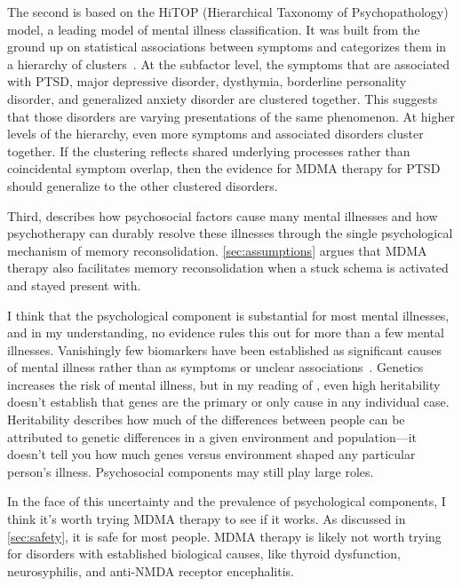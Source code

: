\documentclass[11pt,oneside]{book}
\let\cite\parencite
\begin{document}
The second is based on the HiTOP (Hierarchical Taxonomy of Psychopathology) model, a leading model of mental illness classification. It was built from the ground up on statistical associations between symptoms and categorizes them in a hierarchy of clusters~\cite{kotov2017hierarchical}. At the subfactor level, the symptoms that are associated with PTSD, major depressive disorder, dysthymia, borderline personality disorder, and generalized anxiety disorder are clustered together. This suggests that those disorders are varying presentations of the same phenomenon. At higher levels of the hierarchy, even more symptoms and associated disorders cluster together. If the clustering reflects shared underlying processes rather than coincidental symptom overlap, then the evidence for MDMA therapy for PTSD should generalize to the other clustered disorders.

Third, \textcite{eckerUnlocking} describes how psychosocial factors cause many mental illnesses and how psychotherapy can durably resolve these illnesses through the single psychological mechanism of memory reconsolidation. \cref{sec:assumptions} argues that MDMA therapy also facilitates memory reconsolidation when a stuck schema is activated and stayed present with.

I think that the psychological component is substantial for most mental illnesses, and in my understanding, no evidence rules this out for more than a few mental illnesses. Vanishingly few biomarkers have been established as significant causes of mental illness rather than as symptoms or unclear associations~\cite{carvalhoBiomarker}. Genetics increases the risk of mental illness, but in my reading of \textcite{aftabGenetics,alexanderHeritability1,alexanderHeritability2}, even high heritability doesn't establish that genes are the primary or only cause in any individual case. Heritability describes how much of the differences between people can be attributed to genetic differences in a given environment and population---it doesn't tell you how much genes versus environment shaped any particular person's illness. Psychosocial components may still play large roles.

In the face of this uncertainty and the prevalence of psychological components, I think it's worth trying MDMA therapy to see if it works. As discussed in \cref{sec:safety}, it is safe for most people. MDMA therapy is likely not worth trying for disorders with established biological causes, like thyroid dysfunction, neurosyphilis, and anti-NMDA receptor encephalitis.
\end{document}
